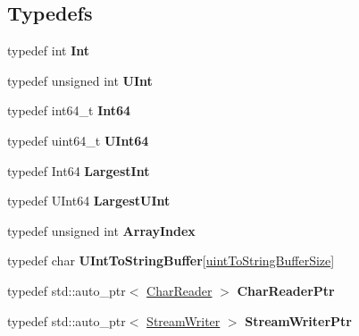 \subsection*{Typedefs}
\begin{DoxyCompactItemize}
\item 
typedef int {\bfseries Int}\hypertarget{namespaceJson_a08122e8005b706d982e48cca1e2119c7}{}\label{namespaceJson_a08122e8005b706d982e48cca1e2119c7}

\item 
typedef unsigned int {\bfseries U\+Int}\hypertarget{namespaceJson_a800fb90eb6ee8d5d62b600c06f87f7d4}{}\label{namespaceJson_a800fb90eb6ee8d5d62b600c06f87f7d4}

\item 
typedef int64\+\_\+t {\bfseries Int64}\hypertarget{namespaceJson_ac62566f36fd33115957b91305c9ed1dc}{}\label{namespaceJson_ac62566f36fd33115957b91305c9ed1dc}

\item 
typedef uint64\+\_\+t {\bfseries U\+Int64}\hypertarget{namespaceJson_adf3fa5cb60c619e4f02315ad355e0ca1}{}\label{namespaceJson_adf3fa5cb60c619e4f02315ad355e0ca1}

\item 
typedef Int64 {\bfseries Largest\+Int}\hypertarget{namespaceJson_a218d880af853ce786cd985e82571d297}{}\label{namespaceJson_a218d880af853ce786cd985e82571d297}

\item 
typedef U\+Int64 {\bfseries Largest\+U\+Int}\hypertarget{namespaceJson_ae202ecad69725e23443f465e257456d0}{}\label{namespaceJson_ae202ecad69725e23443f465e257456d0}

\item 
typedef unsigned int {\bfseries Array\+Index}\hypertarget{namespaceJson_a8048e741f2177c3b5d9ede4a5b8c53c2}{}\label{namespaceJson_a8048e741f2177c3b5d9ede4a5b8c53c2}

\item 
typedef char {\bfseries U\+Int\+To\+String\+Buffer}\mbox{[}\hyperlink{namespaceJson_a2aacab54ef6fc18e833fbd4982a0a23aae4f2008c7919f20d81286121d1374424}{uint\+To\+String\+Buffer\+Size}\mbox{]}\hypertarget{namespaceJson_a602bcf69c2042fb61c3b243cb16f04ca}{}\label{namespaceJson_a602bcf69c2042fb61c3b243cb16f04ca}

\item 
typedef std\+::auto\+\_\+ptr$<$ \hyperlink{classJson_1_1CharReader}{Char\+Reader} $>$ {\bfseries Char\+Reader\+Ptr}\hypertarget{namespaceJson_a4724efb8d41614b47036cb8b54233837}{}\label{namespaceJson_a4724efb8d41614b47036cb8b54233837}

\item 
typedef std\+::auto\+\_\+ptr$<$ \hyperlink{classJson_1_1StreamWriter}{Stream\+Writer} $>$ {\bfseries Stream\+Writer\+Ptr}\hypertarget{namespaceJson_a7132404aeebfc96d7c6ad2c66260afb5}{}\label{namespaceJson_a7132404aeebfc96d7c6ad2c66260afb5}

\end{DoxyCompactItemize}
